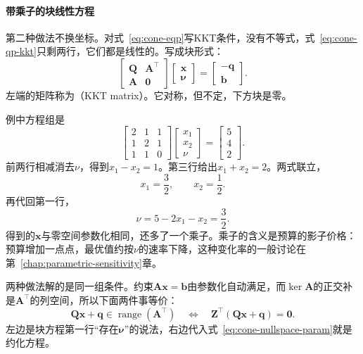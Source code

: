 \paragraph{带乘子的块线性方程}
第二种做法不换坐标。对式~\eqref{eq:cone-eqp}写KKT条件，没有不等式，式~\eqref{eq:cone-qp-kkt}只剩两行，它们都是线性的。写成块形式：
\begin{equation}
 \begin{bmatrix}\bm{Q}&\bm{A}^\top\\\bm{A}&\bm{0}\end{bmatrix}
 \begin{bmatrix}\bm{x}\\\bm{\nu}\end{bmatrix}
 =\begin{bmatrix}-\bm{q}\\\bm{b}\end{bmatrix}.
 \label{eq:cone-kkt-system}
\end{equation}
左端的矩阵称为（KKT matrix）。它对称，但不定，下方块是零。

例中方程组是
\[
 \begin{bmatrix}2&1&1\\1&2&1\\1&1&0\end{bmatrix}
 \begin{bmatrix}x_1\\x_2\\\nu\end{bmatrix}
 =\begin{bmatrix}5\\4\\2\end{bmatrix}.
\]
前两行相减消去$\nu$，得到$x_1-x_2=1$。第三行给出$x_1+x_2=2$。两式联立，
\[
 x_1=\frac32,\qquad x_2=\frac12.
\]
再代回第一行，
\[
 \nu=5-2x_1-x_2=\frac32.
\]
得到的$\bm{x}$与零空间参数化相同，还多了一个乘子。乘子的含义是预算的影子价格：预算增加一点点，最优值约按$\nu$的速率下降，这种变化率的一般讨论在第~\ref{chap:parametric-sensitivity}章。

两种做法解的是同一组条件。约束$\bm{A}\bm{x}=\bm{b}$由参数化自动满足，而$\ker\bm{A}$的正交补是$\bm{A}^\top$的列空间，所以下面两件事等价：
\begin{equation}
 \bm{Q}\bm{x}+\bm{q}\in\operatorname{range}(\bm{A}^\top)
 \quad\Longleftrightarrow\quad
 \bm{Z}^\top(\bm{Q}\bm{x}+\bm{q})=\bm{0}.
 \label{eq:cone-kkt-reduced-equivalence}
\end{equation}
左边是块方程第一行“存在$\bm{\nu}$”的说法，右边代入式~\eqref{eq:cone-nullspace-param}就是约化方程。

